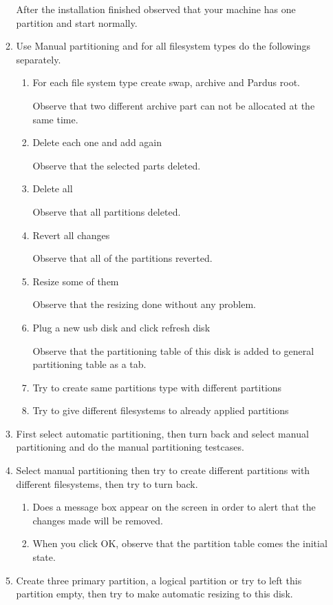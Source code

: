 \documentclass[a4paper,10pt]{article}
\begin{document}
\begin{enumerate}
\begin{enumerate}
        After the installation finished observed that your machine has one partition and start normally.
        \item Use Manual partitioning and for all filesystem types do the followings separately.
        \begin{enumerate}
            \item For each file system type create swap, archive and Pardus root.

            Observe that two different archive part can not be allocated at the same time.
            \item Delete each one and add again

            Observe that the selected parts deleted.
            \item Delete all

            Observe that all partitions deleted.
            \item Revert all changes

            Observe that all of the partitions reverted.
            \item Resize some of them

            Observe that the resizing done without any problem.
            \item Plug a new usb disk and click refresh disk

            Observe that the partitioning table of this disk is added to general partitioning table as a tab.
            \item Try to create same partitions type with different partitions


            \item Try to give different filesystems to already applied partitions

        \end{enumerate}
        \item First select  automatic partitioning,  then turn back and select manual partitioning and do the manual partitioning testcases.
        \item Select manual partitioning then try to create different partitions with different filesystems, then try to turn back.
        \begin{enumerate}
            \item Does a message box appear on the screen in order to alert that the changes made will be removed.
            \item When you click OK, observe that the partition table comes the initial state.
        \end{enumerate}
        \item Create three primary partition, a logical partition or try to left this partition empty, then try to make automatic resizing to this disk.
    \end{enumerate}


\end{enumerate}
\end{document}
